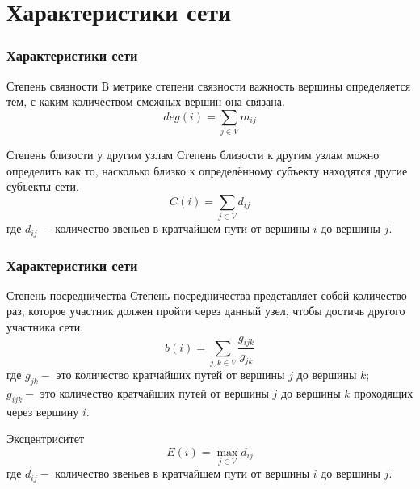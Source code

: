 \documentclass{spbseu}
\begin{document}
    \section{Характеристики сети}

    \begin{frame}
		\frametitle{Характеристики сети}
        \vspace{-10pt}
        \begin{block}{Степень связности}
            \justifying
            В метрике степени связности важность вершины определяется тем, с каким количеством смежных вершин она связана.
            \[ deg(i) = \sum_{j \in V}m_{ij} \]
        \end{block}
        \vfill\pause
        \begin{block}{Степень близости у другим узлам}
            \justifying
            Степень близости к другим узлам можно определить как то, насколько близко к определённому субъекту находятся другие субъекты сети.
            \[ C(i) = \sum_{j \in V}d_{ij} \]
            где $d_{ij} -$ количество звеньев в кратчайшем пути от вершины $i$ до вершины $j$.
        \end{block}
        \tableofcontents[part=3, pausesections]
	\end{frame}

    \begin{frame}
        \frametitle{Характеристики сети}
        \vspace{-10pt}
        \begin{block}{Степень посредничества}
            \justifying
            Степень посредничества представляет собой количество раз, которое участник должен пройти через данный узел, чтобы достичь другого участника сети.
            \[ b(i) = \sum_{j,k \in V} \dfrac{g_{ijk}}{g_{jk}} \]
            где $g_{jk} -$ это количество кратчайших путей от вершины $j$ до вершины $k$;\\
            $g_{ijk} -$ это количество кратчайших путей от вершины $j$ до вершины $k$ проходящих через вершину $i$.
        \end{block}
        \pause
        \vspace{-5pt}
        \begin{block}{Эксцентриситет}
            \justifying
            \[ E(i) = \max_{j \in V}d_{ij} \]
            где $d_{ij} -$ количество звеньев в кратчайшем пути от вершины $i$ до вершины $j$.
        \end{block}
    \end{frame}
    
\end{document}
